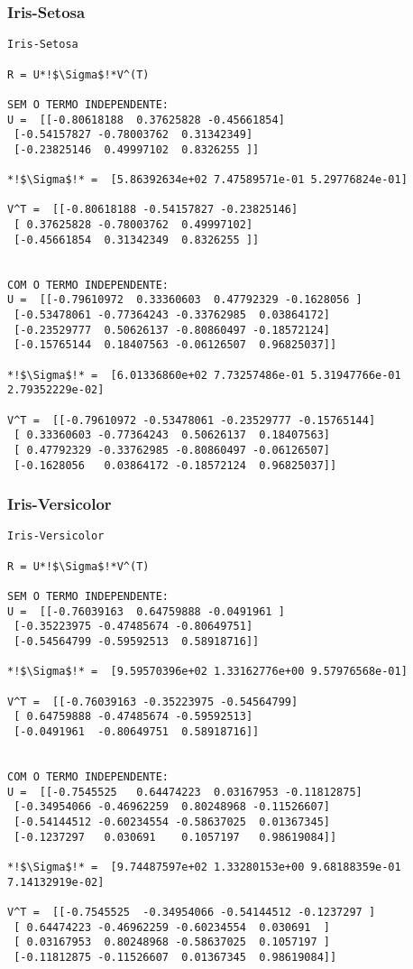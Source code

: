 \documentclass[a4paper,12pt,twoside]{article}
\begin{document}
\subsubsection{Iris-Setosa}
\begin{lstlisting}
Iris-Setosa

R = U*!$\Sigma$!*V^(T)

SEM O TERMO INDEPENDENTE: 
U =  [[-0.80618188  0.37625828 -0.45661854]
 [-0.54157827 -0.78003762  0.31342349]
 [-0.23825146  0.49997102  0.8326255 ]]

*!$\Sigma$!* =  [5.86392634e+02 7.47589571e-01 5.29776824e-01]

V^T =  [[-0.80618188 -0.54157827 -0.23825146]
 [ 0.37625828 -0.78003762  0.49997102]
 [-0.45661854  0.31342349  0.8326255 ]]


COM O TERMO INDEPENDENTE: 
U =  [[-0.79610972  0.33360603  0.47792329 -0.1628056 ]
 [-0.53478061 -0.77364243 -0.33762985  0.03864172]
 [-0.23529777  0.50626137 -0.80860497 -0.18572124]
 [-0.15765144  0.18407563 -0.06126507  0.96825037]]

*!$\Sigma$!* =  [6.01336860e+02 7.73257486e-01 5.31947766e-01 2.79352229e-02]

V^T =  [[-0.79610972 -0.53478061 -0.23529777 -0.15765144]
 [ 0.33360603 -0.77364243  0.50626137  0.18407563]
 [ 0.47792329 -0.33762985 -0.80860497 -0.06126507]
 [-0.1628056   0.03864172 -0.18572124  0.96825037]]
\end{lstlisting}

\subsubsection{Iris-Versicolor}
\begin{lstlisting}
Iris-Versicolor

R = U*!$\Sigma$!*V^(T)

SEM O TERMO INDEPENDENTE: 
U =  [[-0.76039163  0.64759888 -0.0491961 ]
 [-0.35223975 -0.47485674 -0.80649751]
 [-0.54564799 -0.59592513  0.58918716]]

*!$\Sigma$!* =  [9.59570396e+02 1.33162776e+00 9.57976568e-01]

V^T =  [[-0.76039163 -0.35223975 -0.54564799]
 [ 0.64759888 -0.47485674 -0.59592513]
 [-0.0491961  -0.80649751  0.58918716]]


COM O TERMO INDEPENDENTE: 
U =  [[-0.7545525   0.64474223  0.03167953 -0.11812875]
 [-0.34954066 -0.46962259  0.80248968 -0.11526607]
 [-0.54144512 -0.60234554 -0.58637025  0.01367345]
 [-0.1237297   0.030691    0.1057197   0.98619084]]

*!$\Sigma$!* =  [9.74487597e+02 1.33280153e+00 9.68188359e-01 7.14132919e-02]

V^T =  [[-0.7545525  -0.34954066 -0.54144512 -0.1237297 ]
 [ 0.64474223 -0.46962259 -0.60234554  0.030691  ]
 [ 0.03167953  0.80248968 -0.58637025  0.1057197 ]
 [-0.11812875 -0.11526607  0.01367345  0.98619084]]
\end{lstlisting}
\end{document}
